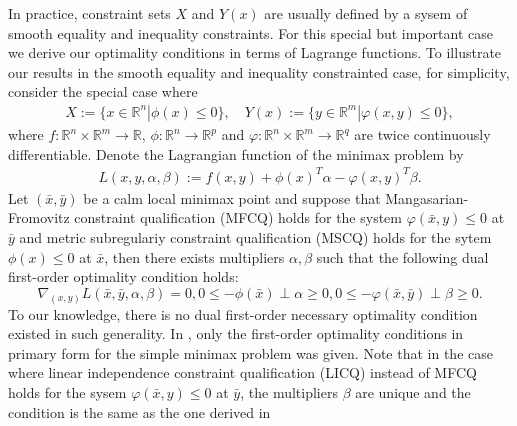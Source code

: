 \documentclass[11pt]{article}
\numberwithin{equation}{section}
\begin{document}
In practice, constraint sets $X$ and $Y(x)$ are usually defined by a sysem of smooth equality and inequality constraints. For this special but important case we derive our optimality conditions in terms of Lagrange functions.  To illustrate our results in the smooth equality and inequality constrainted case, for simplicity, consider the special case where
\begin{eqnarray*}
X:= \{ x\in \mathbb{R}^n | \phi(x)\leq 0\},\quad
Y(x):= \{ y\in \mathbb{R}^m | \varphi (x,y)\leq 0\},
\end{eqnarray*}
where $f:\mathbb{R}^n\times\mathbb{R}^m\rightarrow\mathbb{R}$, $\phi:\mathbb{R}^n\rightarrow\mathbb{R}^p $ and $\varphi:\mathbb{R}^n\times\mathbb{R}^m\rightarrow\mathbb{R}^q$ are twice continuously differentiable. Denote the Lagrangian function of the minimax problem by
\begin{eqnarray*}
L(x,y,\alpha,\beta) := f(x,y) + \phi(x)^T\alpha - \varphi(x,y)^T\beta.
\end{eqnarray*}
 Let $(\bar x,\bar y)$ be a calm local minimax point and suppose  that Mangasarian-Fromovitz constraint qualification (MFCQ) holds for the system $\varphi(\bar x, y)\leq 0$ at $\bar y$ and metric subregulariy constraint qualification (MSCQ) holds for the sytem $\phi(x)\leq 0$ at $\bar x$, then there exists multipliers $\alpha, \beta$ such that the following dual first-order optimality  condition holds:
\begin{equation}\label{multipliersetminimax} \nabla_{(x,y)} L(\bar x,\bar y,\alpha,\beta)=0, 0\leq -\phi(\bar x) \perp \alpha \geq 0,  0\leq -\varphi ( \bar x, \bar y) \perp \beta \geq 0.\end{equation}
To our knowledge,  there is no dual first-order necessary optimality condition existed in such generality. In \cite[Theorem 4.1]{Ma2023}, only the first-order optimality conditions in primary form for the simple minimax problem was given. Note that in the case where linear independence constraint qualification (LICQ) instead of MFCQ holds for the sysem $\varphi(\bar x, y)\leq 0$ at $\bar y$, the multipliers $\beta $ are unique and the condition is the same as the one derived in 
\end{document}

